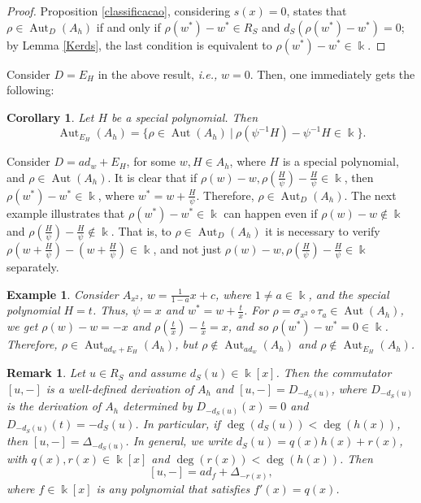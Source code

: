 \documentclass{article}
\numberwithin{equation}{section}\theoremstyle{plain}
\newtheorem{corollary}[theorem]{Corollary}
\newtheorem{example}[theorem]{Example}
\newtheorem{remark}[theorem]{Remark}
\DeclareMathOperator{\Aut}{Aut}
\begin{document}
\begin{proof}
Proposition \ref{classificacao}, considering $s(x)=0$, states that $\rho\in\Aut_D(A_h)$ if and only if $\rho(w^\ast)-w^\ast \in R_S$ and $d_S(\rho(w^\ast)-w^\ast)=0$;
by Lemma \ref{Kerds}, the last condition is equivalent to $\rho(w^\ast)-w^\ast \in \Bbbk$.
\end{proof}

Consider $D=E_H$ in the above result, \emph{i.e.,} $w=0$.
Then, one immediately gets the following:
\begin{corollary}
Let $H$ be a special polynomial. Then
\[
\Aut_{E_H}(A_h)
=
\bigl\{\rho\in\Aut(A_h)\ \big|\ 
\rho(\psi^{-1}H)-\psi^{-1}H\in\Bbbk
\bigr\}.
\]
\end{corollary}

\medbreak

Consider $D=ad_w+E_H$, for some $w, H \in A_h$, where $H$ is a special polynomial, and $\rho \in \Aut(A_h)$.
It is clear that if $\rho(w)-w, \rho\left( \frac{H}{\psi}\right) - \frac{H}{\psi}\in \Bbbk$, then $\rho(w^*)-w^* \in \Bbbk$, where $w^*=w + \frac{H}{\psi}$.
Therefore, $\rho \in \Aut_D(A_h)$.
The next example illustrates that $\rho(w^*)-w^* \in \Bbbk$ can happen even if $\rho(w)-w \notin \Bbbk$ and $\rho(\frac{H}{\psi})-\frac{H}{\psi} \notin \Bbbk$.
That is, to $\rho \in \Aut_D(A_h)$ it is necessary to verify $\rho\left(w + \frac{H}{\psi}\right) - \left( w + \frac{H}{\psi}\right) \in \Bbbk$, and not just $\rho(w)-w, \rho\left( \frac{H}{\psi}\right) - \frac{H}{\psi}\in \Bbbk$ separately.

\begin{example}
Consider $A_{x^2}$, $w=\frac{1}{1-a} x + c$, where $1 \neq a \in \Bbbk$, and the special polynomial $H=t$.
Thus, $\psi = x$ and $w^* = w + \frac{t}{x}$.
For $\rho = \sigma_{x^2} \circ \tau_a \in \Aut(A_h)$, we get $\rho(w)-w = -x$ and $\rho\left(\frac{t}{x}\right) - \frac{t}{x} = x$, and so $\rho(w^*)-w^* = 0 \in \Bbbk$.
Therefore, $\rho \in \Aut_{ad_w + E_H}(A_h)$, but $\rho \notin \Aut_{ad_w}(A_h)$ and $\rho \notin \Aut_{ E_H}(A_h)$.
\end{example}

\begin{remark}
Let $u\in R_S$ and assume $d_S(u)\in \Bbbk[x]$.
Then the commutator $[u,-]$ is a well-defined derivation of $A_h$ and $[u,-]=D_{-d_S(u)}$, where $D_{-d_S(u)}$ is the derivation of $A_h$ determined by $D_{-d_S(u)}(x)=0$ and $D_{-d_S(u)}(t)=-d_S(u)$.
In particular, if $\deg (d_S(u))< \deg (h(x))$, then $
[u,-]=\Delta_{-d_S(u)}$.
In general, we write $d_S(u)=q(x)h(x)+r(x)$, with $q(x),r(x)\in\Bbbk[x]$ and  $\deg(r(x))< \deg(h(x))$.
Then
\[
[u,-]=ad_f+\Delta_{-r(x)},
\]
where $f\in\Bbbk[x]$ is any polynomial that satisfies $f'(x)=q(x)$. 
\end{remark}
\end{document}
